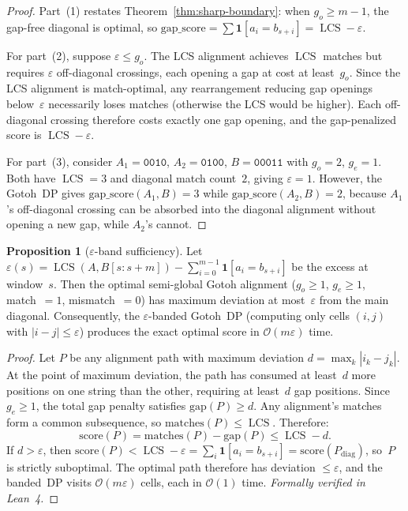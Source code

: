 \documentclass[11pt, a4paper]{article}
\theoremstyle{definition}
\newtheorem{proposition}[theorem]{Proposition}
\theoremstyle{remark}
\newcommand{\LCS}{\operatorname{LCS}}
\newcommand{\bigO}{\mathcal{O}}
\begin{document}
\begin{proof}
Part~(1) restates Theorem~\ref{thm:sharp-boundary}: when
$g_o \geq m - 1$, the gap-free diagonal is optimal, so
$\mathrm{gap\_score} = \sum \mathbf{1}[a_i = b_{s+i}]
= \LCS - \varepsilon$.

For part~(2), suppose $\varepsilon \leq g_o$.  The LCS alignment
achieves $\LCS$ matches but requires $\varepsilon$ off-diagonal
crossings, each opening a gap at cost at least~$g_o$.
Since the
LCS alignment is match-optimal, any rearrangement reducing gap
openings below~$\varepsilon$ necessarily loses matches (otherwise
the LCS would be higher).
Each off-diagonal crossing therefore
costs exactly one gap opening, and the gap-penalized score is
$\LCS - \varepsilon$.

For part~(3), consider $A_1 = \texttt{0010}$,
$A_2 = \texttt{0100}$, $B = \texttt{00011}$ with
$g_o = 2$, $g_e = 1$.
Both have $\LCS = 3$ and diagonal
match count~$2$, giving $\varepsilon = 1$.
However, the
Gotoh~DP gives $\mathrm{gap\_score}(A_1, B) = 3$ while
$\mathrm{gap\_score}(A_2, B) = 2$, because $A_1$'s
off-diagonal crossing can be absorbed into the diagonal
alignment without opening a new gap, while $A_2$'s cannot.
\end{proof}

\begin{proposition}[$\varepsilon$-band sufficiency]
\label{prop:band-sufficiency}
Let $\varepsilon(s) = \LCS(A, B[s{:}s{+}m]) -
  \sum_{i=0}^{m-1} \mathbf{1}[a_i = b_{s+i}]$
be the excess at window~$s$.
Then the optimal semi-global
Gotoh alignment ($g_o \geq 1$, $g_e \geq 1$, match~$= 1$,
mismatch~$= 0$) has maximum deviation at most~$\varepsilon$
from the main diagonal.
Consequently, the $\varepsilon$-banded
Gotoh~DP (computing only cells $(i,j)$ with $|i - j| \leq
\varepsilon$) produces the exact optimal score in
$\bigO(m \varepsilon)$ time.
\end{proposition}

\begin{proof}
Let $P$ be any alignment path with maximum deviation
$d = \max_k |i_k - j_k|$.
At the point of maximum deviation,
the path has consumed at least~$d$ more positions on one string
than the other, requiring at least~$d$ gap positions.
Since
$g_e \geq 1$, the total gap penalty satisfies
$\mathrm{gap}(P) \geq d$.  Any alignment's matches form a common
subsequence, so $\mathrm{matches}(P) \leq \LCS$.
Therefore:
\[
  \mathrm{score}(P) = \mathrm{matches}(P) - \mathrm{gap}(P)
    \leq \LCS - d.
\]
If $d > \varepsilon$, then
$\mathrm{score}(P) < \LCS - \varepsilon
  = \sum_{i} \mathbf{1}[a_i = b_{s+i}]
  = \mathrm{score}(P_{\mathrm{diag}})$,
so~$P$ is strictly suboptimal.
The optimal path therefore has
deviation $\leq \varepsilon$, and the banded~DP visits
$\bigO(m \varepsilon)$ cells, each in $\bigO(1)$ time.
\emph{Formally verified in Lean~4.}
\end{proof}
\end{document}
